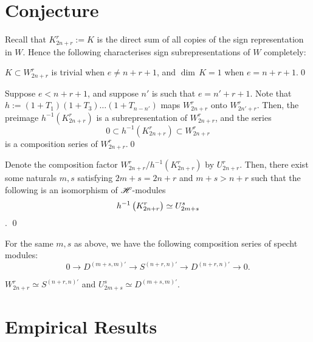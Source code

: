 \documentclass{amsart}
\begin{document}
\section{Conjecture}
Recall that $K_{2n + r}^r := K$ is the direct sum of all copies of the sign representation in $W$.
Hence the following characterises sign subrepresentations of $W$ completely:
\begin{proposition}
  $K \subset W_{2n + r}^r$ is trivial when $e \neq n + r + 1$, and $\dim \, K = 1$ when $e = n + r + 1$.\qed
\end{proposition} 
\begin{proposition}
  Suppose $e < n + r + 1$, and suppose $n'$ is such that $e = n' + r + 1$.
  Note that $h := (1 + T_1)(1 + T_3)\dots(1 + T_{n - n'})$ maps $W_{2n + r}^r$ onto $W_{2n' + r}^r$.
  Then, the preimage $h^{-1}(K_{2n + r}^r)$ is a subrepresentation of $W_{2n + r}^r$, and the series
  \[
    0 \subset h^{-1}(K_{2n + r}^r) \subset W_{2n + r}^r
  \]
  is a composition series of $W_{2n + r}^r$.\qed
\end{proposition}
\begin{proposition}
  Denote the composition factor $W_{2n + r}^r / h^{-1}(K_{2n + r}^r)$ by $U_{2n + r}^r$.
  Then, there exist some naturals $m,s$ satisfying $2m + s = 2n + r$ and $m + s > n + r$ such that the following is an isomorphism of $\mathscr{H}$-modules \[h^{-1}\left( K_{2n + r}^r \right) \simeq U_{2m + s}^s\].
  \qed
\end{proposition}
\begin{proposition}
  For the same $m,s$ as above, we have the following composition series of specht modules:
  \[
    0 \longrightarrow D^{(m+s,m)'} \longrightarrow S^{(n+r,n)'} \longrightarrow D^{(n+r,n)'} \longrightarrow 0.
  \]
\end{proposition}
\begin{proposition}
  $W_{2n + r}^r \simeq S^{(n+r,n)'}$ and $U_{2m +s}^s \simeq D^{(m+s,m)'}$.
\end{proposition}

\section{Empirical Results}



\iffalse
\begin{thebibliography}{9}

\bibitem{Brundan}
  Brundan citation here

\bibitem{Etingof}
  Etingof citation here

\bibitem{Kleschev}
  Kleschev citation here

\bibitem{Mathas Book}
  Mathas book citation here

\bibitem{Mathas}
  Mathas article citation here

\bibitem{Shor}
  Shor citation here

\end{thebibliography}
\fi
\end{document}
